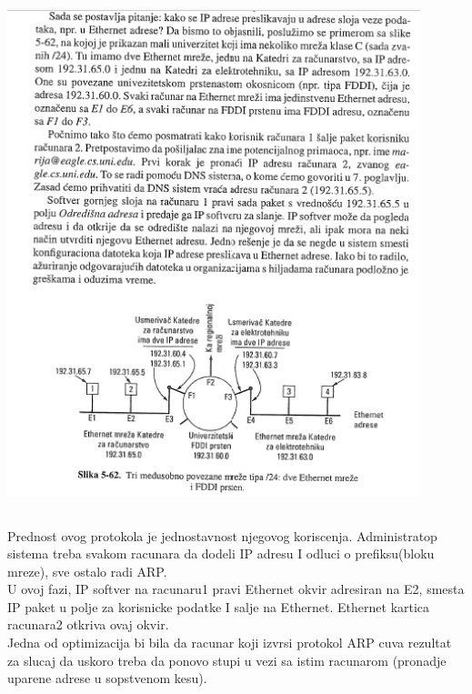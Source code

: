 \documentclass{article} %
\begin{document}
 \begin{center}
\includegraphics[width=12cm, height=15cm]{primerARP}\\
\end{center}
Prednost ovog protokola je jednostavnost njegovog koriscenja. Administratop sistema treba svakom racunara da dodeli IP adresu I odluci o prefiksu(bloku mreze), sve ostalo radi ARP.\\
U ovoj fazi, IP softver na racunaru1 pravi Ethernet okvir adresiran na E2, smesta IP paket u polje za korisnicke podatke I salje na Ethernet. Ethernet kartica racunara2 otkriva ovaj okvir.\\
Jedna od optimizacija bi bila da racunar koji izvrsi protokol ARP cuva rezultat za slucaj da uskoro treba da ponovo stupi u vezi sa istim racunarom (pronadje uparene adrese u sopstvenom kesu).
\end{document}
